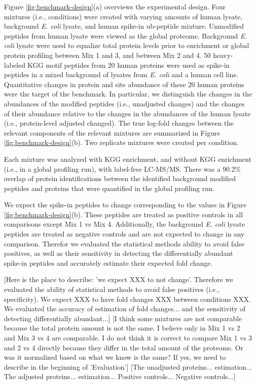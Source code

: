 \documentclass[mcp]{article}
\numberwithin{table}{section}
\def\todo#1{{\color{red}[#1]}}
\begin{document}
\medskip {} Figure \ref{fig:benchmark-design}(a) overviews the experimental design. Four mixtures (i.e., conditions) were created with varying amounts of human lysate, background {\it E. coli} lysate, and human spike-in ub-peptide mixture. Unmodified peptides from human lysate were viewed as the global proteome. Background {\it E. coli} lysate were used to equalize total protein levels prior to enrichment or global protein profiling between Mix 1 and 3, and between Mix 2 and 4.  50 heavy-labeled KGG motif peptides from 20 human proteins were used as spike-in peptides in a mixed background of lysates from {\it E. coli} and a human cell line. Quantitative changes in protein and site abundance of these 20 human proteins were the target of the benchmark. In particular, we distinguish the changes in the abundances of the modified peptides (i.e., unadjusted changes) and the changes of their abundance relative to the changes in the abundances of the human lysate (i.e., protein-level adjusted changed). The true log-fold changes between the relevant components of the relevant mixtures are summarized in Figure \ref{fig:benchmark-design}(b).  Two replicate mixtures were created per condition. 

\medskip {} Each mixture was analyzed with KGG enrichment, and without KGG enrichment (i.e., in a global profiling run), with label-free LC-MS/MS. There was a 90.2\% overlap of protein identifications between the identified background modified peptides and proteins that were quantified in the global profiling run.

\medskip {} We expect the spike-in peptides to change corresponding to the values in Figure \ref{fig:benchmark-design}(b). These peptides are treated as positive controls in all comparisons except Mix 1 vs Mix 4. Additionally, the background {\it E. coli} lysate peptides are treated as negative controls and are not expected to change in any comparison. Therefor we evaluated the statistical methods ability to avoid false positives, as well as their sensitivity in detecting the differentially abundant spike-in peptides and accurately estimate their expected fold change.


\todo{Here is the place to describe: 'we expect XXX to not change'. Therefore we evaluated the ability of statistical methods to avoid false positives (i.e., specificity). We expect XXX to have fold changes XXX between conditions XXX. We evaluated the accuracy of estimation of fold changes... and the sensitivity of detecting differentially abundant...}  
%
\todo{I think some mixtures are not comparable because the total protein amount is not the same. I believe only in Mix 1 vs 2 and Mix 3 vs 4 are comparable. I do not think it is correct to compare Mix 1 vs 3 and 2 vs 4 directly because they differ in the total amount of the proteome. Or was it normalized based on what we know is the same? If yes, we need to describe in the beginning of 'Evaluation'}  \todo{The unadjusted proteins... estimation... The adjusted proteins... estimation... Positive controls... Negative controls...}
\end{document}
